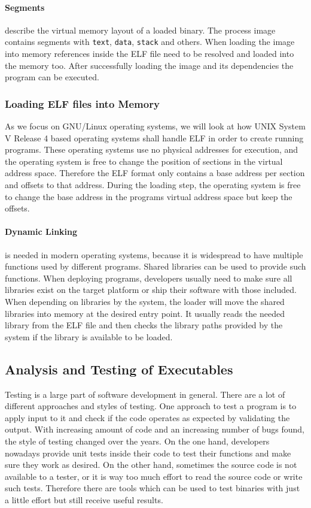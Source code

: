 \paragraph{Segments} describe the virtual memory layout of a loaded binary. The
process image contains segments with \texttt{text}, \texttt{data},
\texttt{stack} and others. When loading the image into memory references inside
the ELF file need to be resolved and loaded into the memory too. After
successfully loading the image and its dependencies the program can be executed.

\subsubsection{Loading ELF files into Memory}

As we focus on GNU/Linux operating systems, we will look at how UNIX System V
Release 4 based operating systems shall handle ELF in order to create running
programs. These operating systems use no physical addresses for execution, and
the operating system is free to change the position of sections in the virtual
address space. Therefore the ELF format only contains a base address per section
and offsets to that address. During the loading step, the operating system is
free to change the base address in the programs virtual address space but keep
the offsets.

\paragraph{Dynamic Linking} is needed in modern operating systems, because it is
widespread to have multiple functions used by different programs. Shared
libraries can be used to provide such functions. When deploying programs,
developers usually need to make sure all libraries exist on the target platform
or ship their software with those included. When depending on libraries by the
system, the loader will move the shared libraries into memory at the desired
entry point. It usually reads the needed library from the ELF file and then
checks the library paths provided by the system if the library is available to
be loaded.

\subsection{Analysis and Testing of Executables}

Testing is a large part of software development in general. There are a lot of
different approaches and styles of testing. One approach to test a program is to
apply input to it and check if the code operates as expected by validating the
output. With increasing amount of code and an increasing number of bugs found,
the style of testing changed over the years. On the one hand, developers
nowadays provide unit tests inside their code to test their functions and make
sure they work as desired. On the other hand, sometimes the source code is not
available to a tester, or it is way too much effort to read the source code or
write such tests. Therefore there are tools which can be used to test binaries
with just a little effort but still receive useful results.

